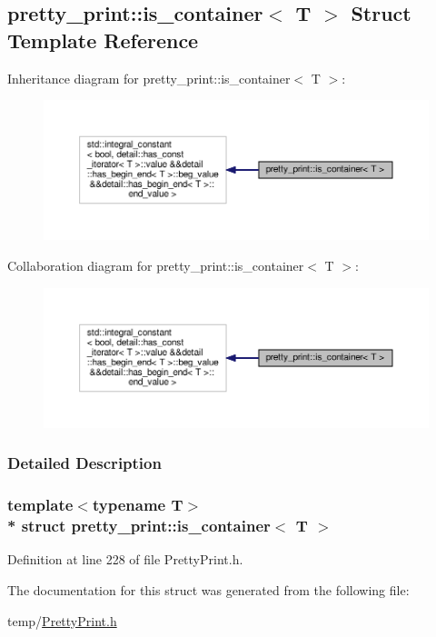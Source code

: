 \hypertarget{structpretty__print_1_1is__container}{}\subsection{pretty\+\_\+print\+:\+:is\+\_\+container$<$ T $>$ Struct Template Reference}
\label{structpretty__print_1_1is__container}


Inheritance diagram for pretty\+\_\+print\+:\+:is\+\_\+container$<$ T $>$\+:\nopagebreak
\begin{figure}[H]
\begin{center}
\leavevmode
\includegraphics[width=350pt]{structpretty__print_1_1is__container__inherit__graph}
\end{center}
\end{figure}


Collaboration diagram for pretty\+\_\+print\+:\+:is\+\_\+container$<$ T $>$\+:\nopagebreak
\begin{figure}[H]
\begin{center}
\leavevmode
\includegraphics[width=350pt]{structpretty__print_1_1is__container__coll__graph}
\end{center}
\end{figure}


\subsubsection{Detailed Description}
\subsubsection*{template$<$typename T$>$\\*
struct pretty\+\_\+print\+::is\+\_\+container$<$ T $>$}



Definition at line 228 of file Pretty\+Print.\+h.



The documentation for this struct was generated from the following file\+:\begin{DoxyCompactItemize}
\item 
temp/\hyperlink{PrettyPrint_8h}{Pretty\+Print.\+h}\end{DoxyCompactItemize}
